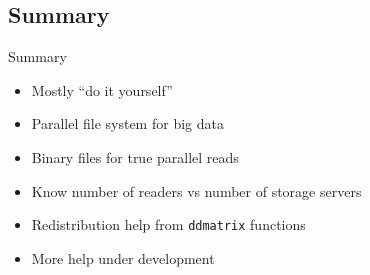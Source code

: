 \subsection{Summary}

\begin{frame}
  \begin{block}{Summary}
    \begin{itemize}
      \item Mostly ``do it yourself''
      \item Parallel file system for big data
      \item Binary files for true parallel reads
      \item Know number of readers vs number of storage servers
      \item Redistribution help from {\tt ddmatrix} functions
      \item More help under development
    \end{itemize}
  \end{block}
\end{frame}